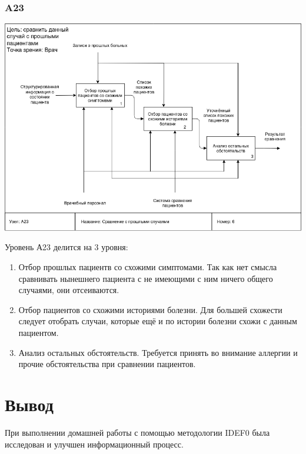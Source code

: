 \documentclass[a4paper, 12pt]{article}
\begin{document}
\subsubsection{A23}
\begin{center}
  \centering
  \includegraphics[width=1\linewidth]{extra/to-be_A23.png}
  \label{fig:prplot}
\end{center}
Уровень А23 делится на 3 уровня:
\begin{enumerate}
  \item Отбор прошлых пациентв со схожими симптомами. Так как нет смысла сравнивать нынешнего пациента с не имеющими с ним ничего общего случаями, они отсеиваются.
  \item Отбор пациентов со схожими историями болезни. Для большей схожести следует отобрать случаи, которые ещё и по истории болезни схожи с данным пациентом.
  \item Анализ остальных обстоятельств. Требуется принять во внимание аллергии и прочие обстоятельства при сравнении пациентов.
\end{enumerate}
\newpage
\section{Вывод}
При выполнении домашней работы с помощью
методологии IDEF0 была исследован и улучшен информационный процесс.
\end{document}
